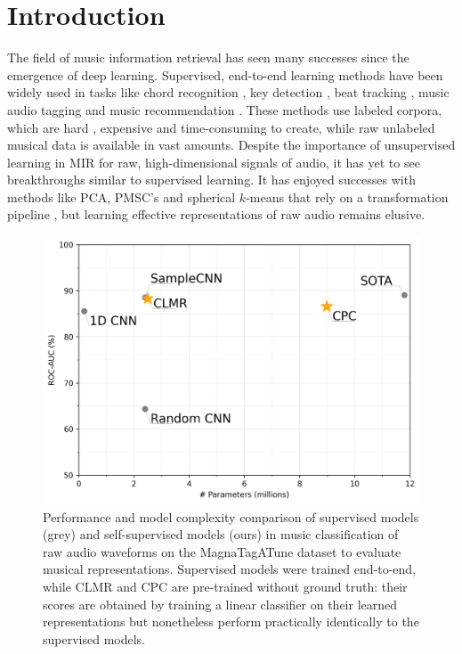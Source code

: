 \chapter{Introduction}\label{sec:introduction}
The field of music information retrieval has seen many successes since the emergence of deep learning. Supervised, end-to-end learning methods have been widely used in tasks like chord recognition \cite{korzeniowski_fully_2016, chen_harmony_2019}, key detection \cite{korzeniowski_end--end_2017}, beat tracking \cite{bock_joint_2016}, music audio tagging \cite{pons_end--end_2017} and music recommendation \cite{van_den_oord_deep_2013}. These methods use labeled corpora, which are hard \cite{doi:10.1080/09298215.2019.1613436}, expensive and time-consuming to create, while raw unlabeled musical data is available in vast amounts. Despite the importance of unsupervised learning in MIR for raw, high-dimensional signals of audio, it has yet to see breakthroughs similar to supervised learning. It has enjoyed successes with methods like PCA, PMSC's and spherical $k$-means that rely on a transformation pipeline \cite{hamel2011temporal, dieleman_feature_learning}, but learning effective representations of raw audio remains elusive. 

\begin{figure}[t]
    \centering
    \includegraphics[width=0.75\columnwidth]{figs/performance.png}
    \caption{Performance and model complexity comparison of supervised models (grey) and self-supervised models (ours) in music classification of raw audio waveforms on the MagnaTagATune dataset to evaluate musical representations. Supervised models were trained end-to-end, while CLMR and CPC are pre-trained without ground truth: their scores are obtained by training a linear classifier on their learned representations but nonetheless perform practically identically to the supervised models.}
    \label{fig:example}
\end{figure}

